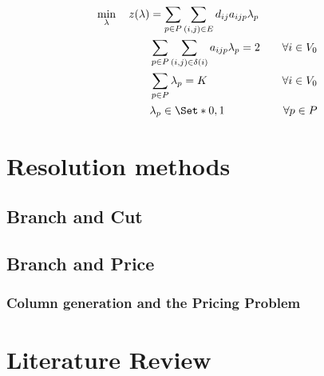 \begin{align}
	\min_{\lambda} \quad z(\lambda) & = \sum_{p \in P} \sum_{(i, j) \in E} d_{ij} a_{ijp} \lambda_p \label{eq:set-partitioning-obj-func}                                                                                                                                           \\
	                                & \sum_{p \in P} \sum_{(i, j) \in \delta(i)} a_{ijp} \lambda_p = 2                                   & \quad \forall i \in V_0                                              \label{eq:set-partitioning-customers-visited-by-exactly-one-route} \\
	                                & \sum_{p \in P} \lambda_{p} = K                                                                     & \quad \forall i \in V_0                                              \label{eq:set-partitioning-K-routes}                               \\
	                                & \lambda_p                    \in \Set*{0, 1}                                                       & \quad \forall p \in P \label{eq:set-partitioning-lambda-mip-var-bounds}
\end{align}



\section{Resolution methods}

\subsection{Branch and Cut}

\subsection{Branch and Price}

\subsubsection{Column generation and the Pricing Problem}

\section{Literature Review}

